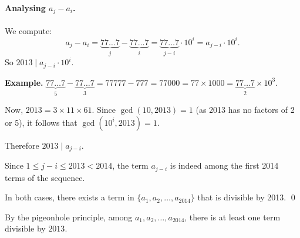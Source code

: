\documentclass[12pt, a4paper]{article}
\begin{document}
\paragraph{Analysing $a_j - a_i$.}
We compute:
\[
  a_j - a_i
  = \underbrace{77\ldots7}_{j} - \underbrace{77\ldots7}_{i}
  = \underbrace{77\ldots7}_{j-i} \cdot 10^i
  = a_{j-i} \cdot 10^i.
\]
So $2013 \mid a_{j-i} \cdot 10^i$.

\textbf{Example.}\; $\underbrace{77\ldots7}_{5} - \underbrace{77\ldots7}_{3} = 77777 - 777 = 77000 = 77 \times 1000 = \underbrace{77\ldots7}_{2} \times 10^3$.

Now, $2013 = 3 \times 11 \times 61$. Since $\gcd(10, 2013) = 1$
(as 2013 has no factors of 2 or 5), it follows that $\gcd(10^i, 2013) = 1$.

Therefore $2013 \mid a_{j-i}$.

Since $1 \le j - i \le 2013 < 2014$, the term $a_{j-i}$ is indeed
among the first 2014 terms of the sequence.

\medskip
In both cases, there exists a term in $\{a_1, a_2, \ldots, a_{2014}\}$
that is divisible by 2013. \qed

\begin{answerbox}
\centering
By the pigeonhole principle, among $a_1, a_2, \ldots, a_{2014}$,
there is at least one term divisible by $2013$.
\end{answerbox}
\end{document}
